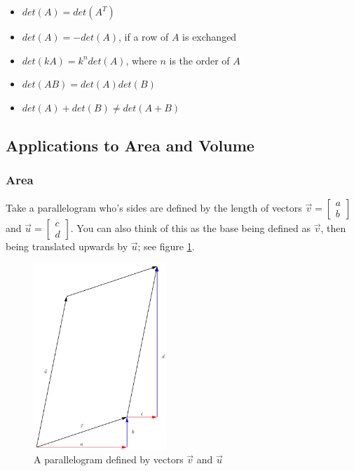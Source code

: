 \documentclass[12pt]{article}
\begin{document}
\begin{itemize}
    \item $det(A) = det(A^T)$
    \item $det(A) = -det(A)$, if a row of $A$ is exchanged
    \item $det(kA) = k^n det(A)$, where $n$ is the order of $A$
    \item $det(AB) = det(A)det(B)$
    \item $det(A) + det(B) \neq det(A+B)$
\end{itemize}

\subsection{Applications to Area and Volume}

\subsubsection{Area}

Take a parallelogram who's sides are defined by the length of vectors $\vec{v} = \begin{bmatrix}
    a\\
    b
\end{bmatrix}$ and $\vec{u} = \begin{bmatrix}
    c\\
    d
\end{bmatrix}$. You can also think of this as the base being defined as $\vec{v}$, then being translated upwards by $\vec{u}$; see figure \ref{fig:parallelogram}.

\begin{figure}
    \centering
    \includegraphics[width=5cm]{misc/parallelogram.png}
    \caption{A parallelogram defined by vectors $\vec{v}$ and $\vec{u}$}
    \label{fig:parallelogram}
\end{figure}
\end{document}
